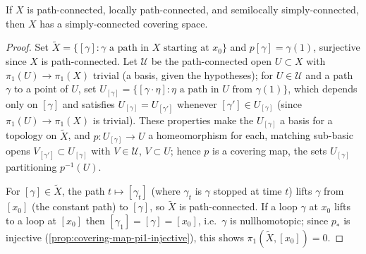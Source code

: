 \begin{proposition}
\label{prop:universal-cover-construction}
If $X$ is path-connected, locally path-connected, and semilocally simply-connected,
then $X$ has a simply-connected covering space.
\end{proposition}

\begin{proof}
Set $\tilde X = \{[\gamma] : \gamma \text{ a path in } X \text{ starting at } x_0\}$ and
$p[\gamma]=\gamma(1)$, surjective since $X$ is path-connected. Let $\mathcal U$ be the
path-connected open $U\subset X$ with $\pi_1(U)\to\pi_1(X)$ trivial (a basis, given the
hypotheses); for $U\in\mathcal U$ and a path $\gamma$ to a point of $U$, set
$U_{[\gamma]} = \{[\gamma\cdot\eta] : \eta \text{ a path in } U \text{ from } \gamma(1)\}$, which depends
only on $[\gamma]$ and satisfies $U_{[\gamma]}=U_{[\gamma']}$ whenever $[\gamma']\in U_{[\gamma]}$
(since $\pi_1(U)\to\pi_1(X)$ is trivial). These properties make the $U_{[\gamma]}$ a basis
for a topology on $\tilde X$, and $p:U_{[\gamma]}\to U$ a homeomorphism for each,
matching sub-basic opens $V_{[\gamma']}\subset U_{[\gamma]}$ with $V\in\mathcal U$, $V\subset U$; hence
$p$ is a covering map, the sets $U_{[\gamma]}$ partitioning $p^{-1}(U)$.

For $[\gamma]\in\tilde X$, the path $t\mapsto[\gamma_t]$ (where $\gamma_t$ is $\gamma$ stopped at time
$t$) lifts $\gamma$ from $[x_0]$ (the constant path) to $[\gamma]$, so $\tilde X$ is
path-connected. If a loop $\gamma$ at $x_0$ lifts to a loop at $[x_0]$ then
$[\gamma_1]=[\gamma]=[x_0]$, i.e.\ $\gamma$ is nullhomotopic; since $p_*$ is injective
(\cref{prop:covering-map-pi1-injective}), this shows $\pi_1(\tilde X,[x_0])=0$.
\end{proof}

